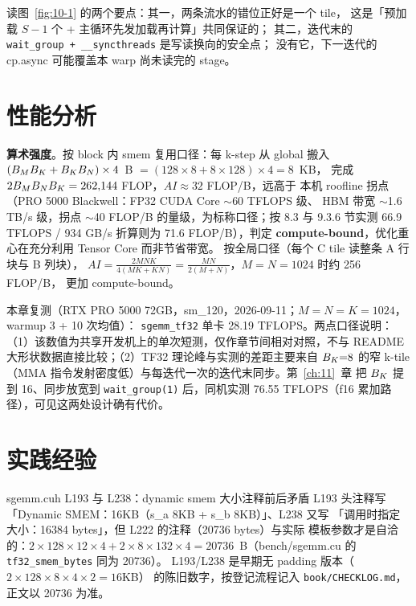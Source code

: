 读图~\ref{fig:10-1} 的两个要点：其一，两条流水的错位正好是一个 tile，
这是「预加载 $S-1$ 个 + 主循环先发加载再计算」共同保证的；
其二，迭代末的 \texttt{wait\_\allowbreak{}group + \_\allowbreak{}\_\allowbreak{}syncthreads} 是写读换向的安全点；
没有它，下一迭代的 cp.async 可能覆盖本 warp 尚未读完的 stage。

\section{性能分析}

\textbf{算术强度}。按 block 内 smem 复用口径：每 k-step 从 global 搬入
$(B\sb M B\sb K + B\sb K B\sb N)\times4$~B $= (128{\times}8{+}8{\times}128)\times4 = 8$~KB，
完成 $2 B\sb M B\sb N B\sb K = 262{,}144$ FLOP，$AI \approx 32$ FLOP/B，远高于
本机 roofline 拐点（PRO 5000 Blackwell：FP32 CUDA Core $\sim$60 TFLOPS 级、
HBM 带宽 $\sim$1.6 TB/s 级，拐点 $\sim$40 FLOP/B 的量级，为标称口径；按
8.3 与 9.3.6 节实测 66.9 TFLOPS / 934 GB/s 折算则为 71.6 FLOP/B），判定
\textbf{compute-bound}，优化重心在充分利用 Tensor Core 而非节省带宽。
按全局口径（每个 C tile 读整条 A 行块与 B 列块），
$AI = \frac{2MNK}{4(MK+KN)} = \frac{MN}{2(M+N)}$，$M{=}N{=}1024$ 时约 256 FLOP/B，
更加 compute-bound。

本章复测（RTX PRO 5000 72GB，sm\_120，2026-09-11；$M{=}N{=}K{=}1024$，
warmup 3 + 10 次均值）：
\texttt{sgemm\_tf32} 单卡 28.19 TFLOPS。两点口径说明：
（1）该数值为共享开发机上的单次短测，仅作章节间相对对照，不与 README
大形状数据直接比较；（2）TF32 理论峰与实测的差距主要来自 $B\sb K{=}8$ 的窄
k-tile（MMA 指令发射密度低）与每迭代一次的迭代末同步。第~\ref{ch:11}~章
把 $B\sb K$ 提到 16、同步放宽到 \texttt{wait\_\allowbreak{}group\allowbreak{}(1)} 后，同机实测
76.55 TFLOPS（f16 累加路径），可见这两处设计确有代价。

\section{实践经验}

\begin{kaogu}[F4]{sgemm.cuh L193 与 L238：dynamic smem 大小注释前后矛盾}
  L193 头注释写「Dynamic SMEM：16KB（s\_a 8KB + s\_b 8KB）」、L238 又写
  「调用时指定大小：16384 bytes」，但 L222 的注释（20736 bytes）与实际
  模板参数才是自洽的：$2\times128\times12\times4 + 2\times8\times132\times4
  = 20736$~B（bench/sgemm.cu 的 \texttt{tf32\_\allowbreak{}smem\_\allowbreak{}bytes} 同为 20736）。
  L193/L238 是早期无 padding 版本（$2\times128\times8\times4\times2=16$KB）
  的陈旧数字，按登记流程记入 \texttt{book/\allowbreak{}CHECKLOG.\allowbreak{}md}，正文以 20736 为准。
\end{kaogu}

